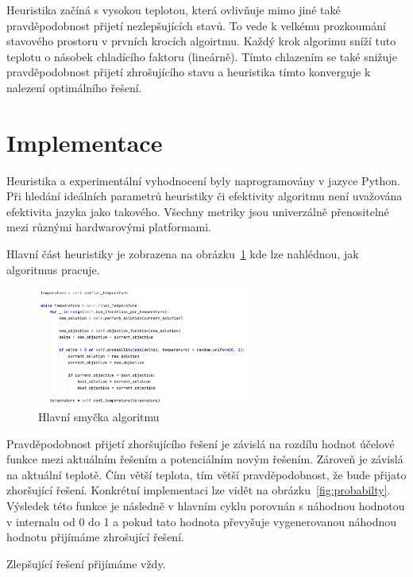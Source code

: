 \documentclass[twoside,twocolumn]{article}
\begin{document}
    Heuristika začíná s vysokou teplotou, která ovlivňuje mimo jiné také pravděpodobnost přijetí nezlepšujících stavů.
    To vede k velkému prozkoumání stavového prostoru v prvních krocích algoirtmu.
    Každý krok algorimu sníží tuto teplotu o násobek chladícího faktoru (lineárně).
    Tímto chlazením se také snižuje pravděpodobnost přijetí zhrošujícího stavu a heuristika tímto konverguje k nalezení
    optimálního řešení.



    \section{Implementace}

    Heuristika a experimentální vyhodnocení byly naprogramovány v jazyce Python.
    Při hledání ideálních parametrů heuristiky či efektivity algoritmu není uvažována efektivita jazyka jako takového.
    Všechny metriky jsou univerzálně přenositelné mezi různými hardwarovými platformami.

    Hlavní část heuristiky je zobrazena na obrázku~\ref{fig:main-loop} kde lze nahlédnou, jak algoritmus pracuje.

    \begin{figure}
        \centering
        \includegraphics[width=7cm]{images/main-loop}
        \caption{Hlavní smyčka algoritmu}
        \label{fig:main-loop}
    \end{figure}

    Pravděpodobnost přijetí zhoršujícího řešení je závislá na rozdílu hodnot účelové funkce mezi aktuálním řešením a potenciálním novým řešením.
    Zároveň je závislá na aktuální teplotě. Čím větší teplota, tím větší pravděpodobnost, že bude přijato zhoršující řešení.
    Konkrétní implementaci lze vidět na obrázku~\ref{fig:probabilty}.
    Výsledek této funkce je následně v hlavním cyklu porovnán s náhodnou hodnotou v internalu od 0 do 1 a pokud tato hodnota
    převyšuje vygenerovanou náhodnou hodnotu přijímáme zhrošující řešení.

    Zlepšující řešení přijímáme vždy.
\end{document}
